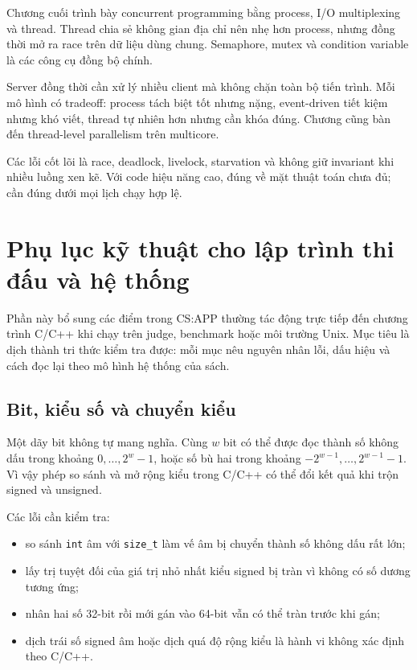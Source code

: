 \documentclass[11pt]{article}
\begin{document}
Chương cuối trình bày concurrent programming bằng process, I/O multiplexing và
thread. Thread chia sẻ không gian địa chỉ nên nhẹ hơn process, nhưng đồng thời
mở ra race trên dữ liệu dùng chung. Semaphore, mutex và condition variable là
các công cụ đồng bộ chính.

Server đồng thời cần xử lý nhiều client mà không chặn toàn bộ tiến trình. Mỗi
mô hình có tradeoff: process tách biệt tốt nhưng nặng, event-driven tiết kiệm
nhưng khó viết, thread tự nhiên hơn nhưng cần khóa đúng. Chương cũng bàn đến
thread-level parallelism trên multicore.

Các lỗi cốt lõi là race, deadlock, livelock, starvation và không giữ invariant khi
nhiều luồng xen kẽ. Với code hiệu năng cao, đúng về mặt thuật toán chưa đủ;
cần đúng dưới mọi lịch chạy hợp lệ.

\section{Phụ lục kỹ thuật cho lập trình thi đấu và hệ thống}

Phần này bổ sung các điểm trong CS:APP thường tác động trực tiếp đến chương
trình C/C++ khi chạy trên judge, benchmark hoặc môi trường Unix. Mục tiêu là
dịch thành tri thức kiểm tra được: mỗi mục nêu nguyên nhân lỗi, dấu hiệu và cách
đọc lại theo mô hình hệ thống của sách.

\subsection{Bit, kiểu số và chuyển kiểu}

Một dãy bit không tự mang nghĩa. Cùng \(w\) bit có thể được đọc thành số không
dấu trong khoảng \(0,\ldots,2^w-1\), hoặc số bù hai trong khoảng
\(-2^{w-1},\ldots,2^{w-1}-1\). Vì vậy phép so sánh và mở rộng kiểu trong C/C++
có thể đổi kết quả khi trộn signed và unsigned.

Các lỗi cần kiểm tra:
\begin{itemize}
  \item so sánh \texttt{int} âm với \texttt{size\_t} làm vế âm bị chuyển thành
        số không dấu rất lớn;
  \item lấy trị tuyệt đối của giá trị nhỏ nhất kiểu signed bị tràn vì không có
        số dương tương ứng;
  \item nhân hai số 32-bit rồi mới gán vào 64-bit vẫn có thể tràn trước khi gán;
  \item dịch trái số signed âm hoặc dịch quá độ rộng kiểu là hành vi không xác
        định theo C/C++.
\end{itemize}
\end{document}
